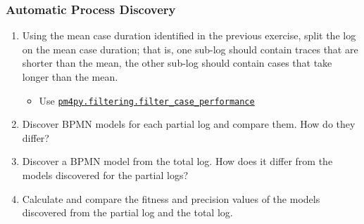 \begin{exercisebox}

\subsubsection*{Automatic Process Discovery}

\begin{enumerate}
    \item Using the mean case duration identified in the previous exercise, split the log on the mean case duration; that is, one sub-log should contain traces that are shorter than the mean, the other sub-log should contain cases that take longer than the mean.
    \begin{itemize}
       \item Use \href{https://processintelligence.solutions/static/api/2.7.11/generated/pm4py.filtering.filter_case_performance.html}{\texttt{pm4py.filtering.filter\_case\_performance}}
    \end{itemize}
    \item Discover BPMN models for each partial log and compare them. How do they differ?
    \item Discover a BPMN model from the total log. How does it differ from the models discovered for the partial logs?
    \item Calculate and compare the fitness and precision values of the models discovered from the partial log and the total log.
\end{enumerate}
\end{exercisebox}

